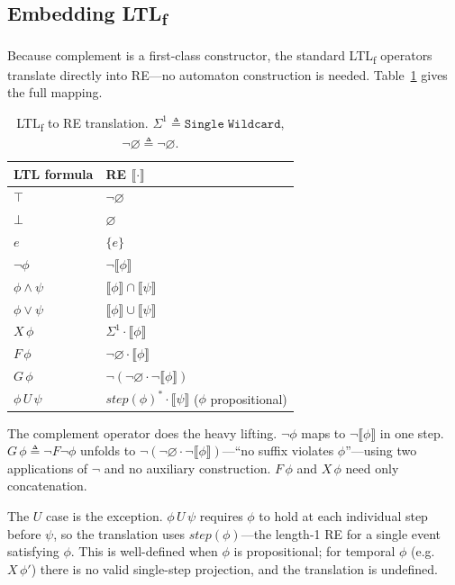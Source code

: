 \documentclass[acmsmall,screen]{acmart}
\newcommand{\sem}[1]{\llbracket #1 \rrbracket}
\newcommand{\univ}{\neg\varnothing}
\begin{document}
\subsection{Embedding LTL\textsubscript{f}}
\label{sec:ltl}

Because complement is a first-class constructor, the standard
LTL\textsubscript{f} operators translate directly into RE---no
automaton construction is needed.
Table~\ref{tab:ltl} gives the full mapping.

\begin{table}[h]
\caption{LTL\textsubscript{f} to RE translation.
         $\Sigma^1 \triangleq \mathtt{Single\;Wildcard}$,
         $\univ \triangleq \neg\varnothing$.}
\label{tab:ltl}
\begin{tabular}{ll}
\toprule
LTL formula & RE $\sem{\cdot}$ \\
\midrule
$\top$              & $\univ$ \\
$\bot$              & $\varnothing$ \\
$e$                 & $\{e\}$ \\
$\neg\phi$          & $\neg\sem{\phi}$ \\
$\phi \wedge \psi$  & $\sem{\phi} \cap \sem{\psi}$ \\
$\phi \vee \psi$    & $\sem{\phi} \cup \sem{\psi}$ \\
$X\,\phi$           & $\Sigma^1 \cdot \sem{\phi}$ \\
$F\,\phi$           & $\univ \cdot \sem{\phi}$ \\
$G\,\phi$           & $\neg(\univ \cdot \neg\sem{\phi})$ \\
$\phi\,U\,\psi$     & $\mathit{step}(\phi)^* \cdot \sem{\psi}$
                      \quad ($\phi$ propositional) \\
\bottomrule
\end{tabular}
\end{table}

The complement operator does the heavy lifting.
$\neg\phi$ maps to $\neg\sem{\phi}$ in one step.
$G\,\phi \triangleq \neg F\neg\phi$ unfolds to
$\neg(\univ\cdot\neg\sem{\phi})$---``no suffix violates
$\phi$''---using two applications of $\neg$ and no auxiliary
construction.
$F\,\phi$ and $X\,\phi$ need only concatenation.

The $U$ case is the exception.
$\phi\,U\,\psi$ requires $\phi$ to hold at each individual step
before $\psi$, so the translation uses
$\mathit{step}(\phi)$---the length-1 RE for a single event
satisfying $\phi$.
This is well-defined when $\phi$ is propositional; for temporal
$\phi$ (e.g.\ $X\,\phi'$) there is no valid single-step projection,
and the translation is undefined.
\end{document}
